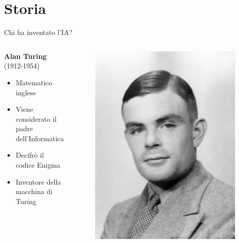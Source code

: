 \documentclass{beamer}
\begin{document}
\section{Storia}
\begin{frame}{Chi ha inventato l'IA?}
    \begin{columns}[T]
    \begin{column}{.48\textwidth}
        \textbf{Alan Turing} (1912-1954)
        
        \begin{itemize}
            \item Matematico inglese
            \item Viene considerato il padre dell'Informatica
            \item Decifrò il codice Enigma
            \item Inventore della macchina di Turing
        \end{itemize}
    \end{column}

    \hfill
    
    \begin{column}{.48\textwidth}
        \begin{figure}
            \centering
            \includegraphics[width=.9\linewidth]{imgs/turing.jpg}
        \end{figure}
    \end{column}
    \end{columns}
\end{frame}
\end{document}

